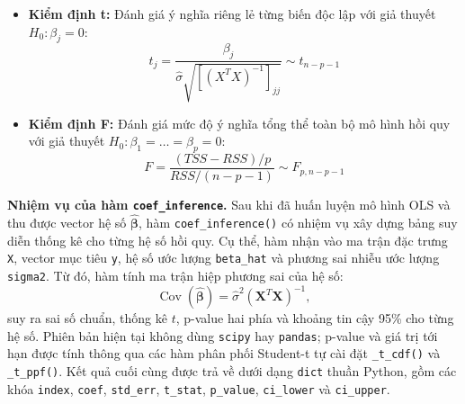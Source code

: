 \documentclass[12pt,a4paper]{report}
\begin{document}
\begin{itemize}
    \item \textbf{Kiểm định t:} Đánh giá ý nghĩa riêng lẻ từng biến độc lập với giả thuyết $H_0: \beta_j = 0$:
    \begin{equation}
        t_j = \frac{\beta_j}{\hat{\sigma}\sqrt{[(X^TX)^{-1}]_{jj}}} \sim t_{n-p-1}
    \end{equation}
    \item \textbf{Kiểm định F:} Đánh giá mức độ ý nghĩa tổng thể toàn bộ mô hình hồi quy với giả thuyết $H_0: \beta_1 = \dots = \beta_p = 0$:
    \begin{equation}
        F = \frac{(TSS - RSS) / p}{RSS / (n - p - 1)} \sim F_{p, n-p-1}
    \end{equation}
\end{itemize}
\textbf{Nhiệm vụ của hàm \texttt{coef\_inference}.}
Sau khi đã huấn luyện mô hình OLS và thu được vector hệ số $\hat{\boldsymbol{\beta}}$, hàm \texttt{coef\_inference()} có nhiệm vụ xây dựng bảng suy diễn thống kê cho từng hệ số hồi quy. Cụ thể, hàm nhận vào ma trận đặc trưng \texttt{X}, vector mục tiêu \texttt{y}, hệ số ước lượng \texttt{beta\_hat} và phương sai nhiễu ước lượng \texttt{sigma2}. Từ đó, hàm tính ma trận hiệp phương sai của hệ số:
\[
    \operatorname{Cov}(\hat{\boldsymbol{\beta}})
    =
    \hat{\sigma}^2(\mathbf{X}^T\mathbf{X})^{-1},
\]
suy ra sai số chuẩn, thống kê $t$, p-value hai phía và khoảng tin cậy 95\% cho từng hệ số. Phiên bản hiện tại không dùng \texttt{scipy} hay \texttt{pandas}; p-value và giá trị tới hạn được tính thông qua các hàm phân phối Student-t tự cài đặt \texttt{\_t\_cdf()} và \texttt{\_t\_ppf()}. Kết quả cuối cùng được trả về dưới dạng \texttt{dict} thuần Python, gồm các khóa \texttt{index}, \texttt{coef}, \texttt{std\_err}, \texttt{t\_stat}, \texttt{p\_value}, \texttt{ci\_lower} và \texttt{ci\_upper}.
\pagebreak
\end{document}
